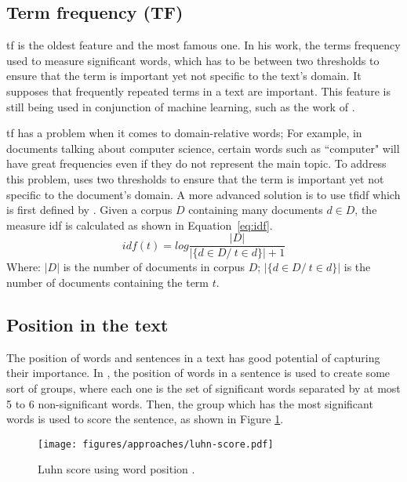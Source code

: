 \subsection{Term frequency (TF)}

\ac{tf} is the oldest feature \citep{58-luhn} and the most famous one. 
In his work, the terms frequency used to measure significant words, which has to be between two thresholds to ensure that the term is important yet not specific to the text's domain.
It supposes that frequently repeated terms in a text are important.
This feature is still being used in conjunction of machine learning, such as the work of \citet{17-yousefiAzar-hamey}.

\ac{tf} has a problem when it comes to domain-relative words; For example, in documents talking about computer science, certain words such as ``computer" will have great frequencies even if they do not represent the main topic.
To address this problem, \citet{58-luhn} uses two thresholds to ensure that the term is important yet not specific to the document's domain.
A more advanced solution is to use \ac{tfidf} which is first defined by \citet{73-salton-yang}.
Given a corpus $ D $ containing many documents $ d \in D $, the measure \ac{idf} is calculated as shown in Equation~\ref{eq:idf}.
\begin{equation}
	\label{eq:idf}
	idf(t) = log{\frac{|D|}{|\{d \in D /\ t \in d\}|+1}}
\end{equation}
Where: 
$ |D| $ is the number of documents in corpus $ D $;
$ |\{d \in D /\ t \in d\}| $ is the number of documents containing the term $ t $.

\subsection{Position in the text}

The position of words \citep{58-luhn} and sentences \citep{58-baxendale,69-edmundson} in a text has good potential of capturing their importance. 
In \citep{58-luhn}, the position of words in a sentence is used to create some sort of groups, where each one is the set of significant words separated by at most 5 to 6 non-significant words. 
Then, the group which has the most significant words is used to score the sentence, as shown in Figure \ref{fig:luhn-score}.

\begin{figure}[!ht]
	\centering
	\texttt{[image: figures/approaches/luhn-score.pdf]} %
	\caption{Luhn score using word position \citep{58-luhn}.}
	\label{fig:luhn-score}
\end{figure}

